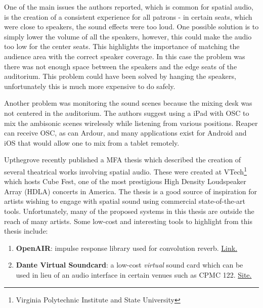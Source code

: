 One of the main issues the authors reported, which is common for spatial audio, is the creation of a consistent experience for all patrons - in certain seats, which were close to speakers, the sound effects were too loud. One possible solution is to simply lower the volume of all the speakers, however, this could make the audio too low for the center seats. This highlights the importance of matching the audience area with the correct speaker coverage. In this case the problem was there was not enough space between the speakers and the edge seats of the auditorium. This problem could have been solved by hanging the speakers, unfortunately this is much more expensive to do safely.

Another problem was monitoring the sound scenes because the mixing desk was not centered in the auditorium. The authors suggest using a iPad with OSC to mix the ambisonic scenes wirelessly while listening from various positions. Reaper can receive OSC, as can Ardour, and many applications exist for Android and iOS that would allow one to mix from a tablet remotely. 

Upthegrove \cite{upthegrove2019auragami} recently published a MFA thesis which described the creation of several theatrical works involving spatial audio. These were created at VTech\footnote{Virginia Polytechnic Institute and State University} which hosts Cube Fest, one of the most prestigious High Density Loudspeaker Array (HDLA) concerts in America. The thesis is a good source of inspiration for artists wishing to engage with spatial sound using commercial state-of-the-art tools. Unfortunately, many of the proposed systems in this thesis are outside the reach of many artists. Some low-cost and interesting tools to highlight from this thesis include:

\begin{enumerate}
    \item \textbf{OpenAIR}: impulse response library used for convolution reverb. \href{https://openairlib.net/}{Link.}
    \item \textbf{Dante Virtual Soundcard}: a low-cost \textit{virtual} sound card which can be used in lieu of an audio interface in certain venues such as CPMC 122. \href{https://www.audinate.com/products/software/dante-virtual-soundcard?force=true}{Site.}
\end{enumerate}


